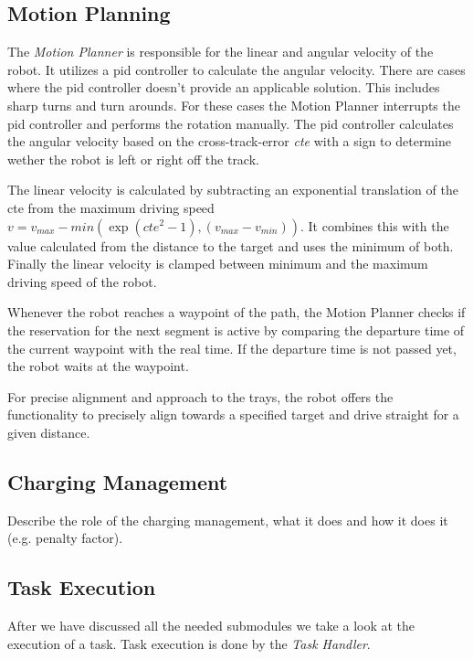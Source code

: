 \documentclass[journal]{IEEEtran}
\begin{document}
\subsection{Motion Planning}
\label{subsec:motion_planning}
The \emph{Motion Planner} is responsible for the linear and angular velocity of the robot. It utilizes a pid controller to calculate the angular velocity. There are cases where the pid controller doesn't provide an applicable solution. This includes sharp turns and turn arounds. For these cases the Motion Planner interrupts the pid controller and performs the rotation manually. The pid controller calculates the angular velocity based on the cross-track-error \emph{cte} with a sign to determine wether the robot is left or right off the track.

The linear velocity is calculated by subtracting an exponential translation of the cte from the maximum driving speed $v = v_{max} - min(\exp(cte^2-1), (v_{max}-v_{min}))$. It combines this with the value calculated from the distance to the target and uses the minimum of both. Finally the linear velocity is clamped between minimum and the maximum driving speed of the robot.

Whenever the robot reaches a waypoint of the path, the Motion Planner checks if the reservation for the next segment is active by comparing the departure time of the current waypoint with the real time. If the departure time is not passed yet, the robot waits at the waypoint.

For precise alignment and approach to the trays, the robot offers the functionality to precisely align towards a specified target and drive straight for a given distance.

\subsection{Charging Management}
\label{subsec:charging_management}
Describe the role of the charging management, what it does and how it does it (e.g. penalty factor).

\subsection{Task Execution}
\label{subsec:task_execution}
After we have discussed all the needed submodules we take a look at the execution of a task. Task execution is done by the \textit{Task Handler}.
\end{document}
